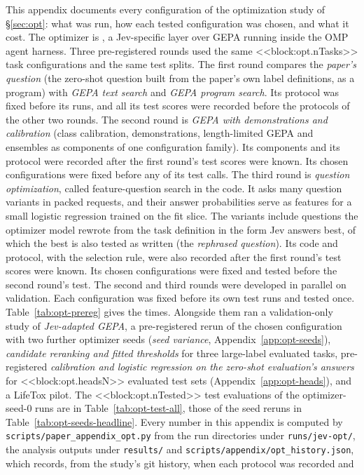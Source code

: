 \providecommand{\bodyRerunN}{\ai{bodyRerunN}}\providecommand{\bodyRerunIdentical}{\ai{bodyRerunIdentical}}\providecommand{\bodyRerunFlips}{\ai{bodyRerunFlips}}\providecommand{\bodyRerunFlipPct}{\ai{bodyRerunFlipPct}}\providecommand{\bodyRerunChangedPct}{\ai{bodyRerunChangedPct}}\providecommand{\bodyRerunMedDiff}{\ai{bodyRerunMedDiff}}
This appendix documents every configuration of the optimization study of \S\ref{sec:opt}: what was run, how each tested configuration was chosen, and what it cost. The optimizer is \jevopt{}, a Jev-specific layer over GEPA running inside the OMP agent harness. Three pre-registered rounds used the same <<block:opt.nTasks>> task configurations and the same test splits. The first round compares the \emph{paper's question} (the zero-shot question built from the paper's own label definitions, as a program) with \emph{GEPA text search} and \emph{GEPA program search}. Its protocol was fixed before its runs, and all its test scores were recorded before the protocols of the other two rounds. The second round is \emph{GEPA with demonstrations and calibration} (class calibration, demonstrations, length-limited GEPA and ensembles as components of one configuration family). Its components and its protocol were recorded after the first round's test scores were known. Its chosen configurations were fixed before any of its test calls. The third round is \emph{question optimization}, called feature-question search in the code. It asks many question variants in packed requests, and their answer probabilities serve as features for a small logistic regression trained on the fit slice. The variants include questions the optimizer model rewrote from the task definition in the form Jev answers best, of which the best is also tested as written (the \emph{rephrased question}). Its code and protocol, with the selection rule, were also recorded after the first round's test scores were known. Its chosen configurations were fixed and tested before the second round's test. The second and third rounds were developed in parallel on validation. Each configuration was fixed before its own test runs and tested once. Table~\ref{tab:opt-prereg} gives the times. Alongside them ran a validation-only study of \emph{Jev-adapted GEPA}, a pre-registered rerun of the chosen configuration with two further optimizer seeds (\emph{seed variance}, Appendix~\ref{app:opt-seeds}), \emph{candidate reranking and fitted thresholds} for three large-label evaluated tasks, pre-registered \emph{calibration and logistic regression on the zero-shot evaluation's answers} for <<block:opt.headsN>> evaluated test sets (Appendix~\ref{app:opt-heads}), and a LifeTox pilot. The <<block:opt.nTested>> test evaluations of the optimizer-seed-0 runs are in Table~\ref{tab:opt-test-all}, those of the seed reruns in Table~\ref{tab:opt-seeds-headline}. Every number in this appendix is computed by \texttt{scripts/\allowbreak paper\_appendix\_opt.py} from the run directories under \texttt{runs/\allowbreak jev-opt/}, the analysis outputs under \texttt{results/} and \texttt{scripts/\allowbreak appendix/\allowbreak opt\_history.json}, which records, from the study's git history, when each protocol was recorded and 